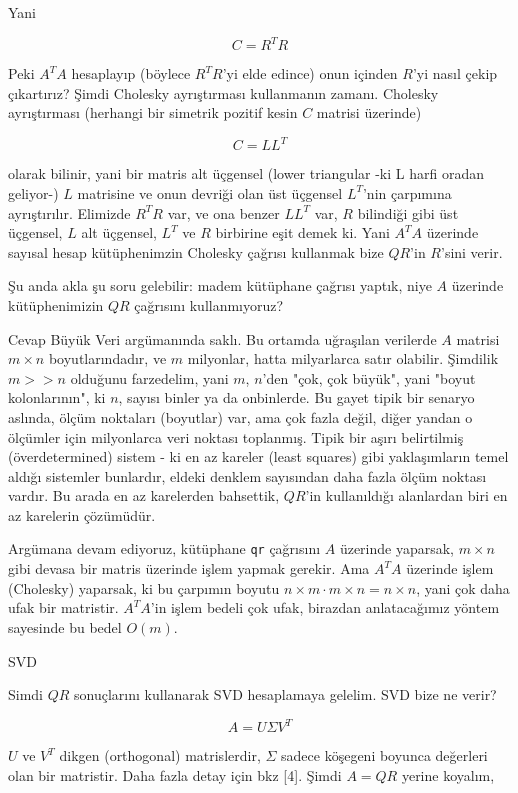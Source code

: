 \documentclass[12pt,fleqn]{article}\usepackage{../../common}
\begin{document}
Yani

$$
C = R^TR
$$

Peki $A^TA$ hesaplayıp (böylece $R^TR$'yi elde edince) onun içinden $R$'yi nasıl
çekip çıkartırız? Şimdi Cholesky ayrıştırması kullanmanın zamanı. Cholesky
ayrıştırması (herhangi bir simetrik pozitif kesin $C$ matrisi üzerinde)

$$C = LL^T$$

olarak bilinir, yani bir matris alt üçgensel (lower triangular -ki L harfi
oradan geliyor-) $L$ matrisine ve onun devriği olan üst üçgensel $L^T$'nin
çarpımına ayrıştırılır. Elimizde $R^TR$ var, ve ona benzer $LL^T$ var, $R$
bilindiği gibi üst üçgensel, $L$ alt üçgensel, $L^T$ ve $R$ birbirine eşit demek
ki. Yani $A^TA$ üzerinde sayısal hesap kütüphenimzin Cholesky çağrısı kullanmak
bize $QR$'in $R$'sini verir.

Şu anda akla şu soru gelebilir: madem kütüphane çağrısı yaptık, niye $A$
üzerinde kütüphenimizin $QR$ çağrısını kullanmıyoruz?

Cevap Büyük Veri argümanında saklı. Bu ortamda uğraşılan verilerde $A$ matrisi
$m \times n$ boyutlarındadır, ve $m$ milyonlar, hatta milyarlarca satır
olabilir. Şimdilik $m >> n$ olduğunu farzedelim, yani $m$, $n$'den "çok, çok
büyük", yani "boyut kolonlarının", ki $n$, sayısı binler ya da onbinlerde. Bu
gayet tipik bir senaryo aslında, ölçüm noktaları (boyutlar) var, ama çok fazla
değil, diğer yandan o ölçümler için milyonlarca veri noktası toplanmış. Tipik
bir aşırı belirtilmiş (överdetermined) sistem - ki en az kareler (least squares)
gibi yaklaşımların temel aldığı sistemler bunlardır, eldeki denklem sayısından
daha fazla ölçüm noktası vardır. Bu arada en az karelerden bahsettik, $QR$'in
kullanıldığı alanlardan biri en az karelerin çözümüdür.

Argümana devam ediyoruz, kütüphane \verb!qr! çağrısını $A$ üzerinde yaparsak, $m
\times n$ gibi devasa bir matris üzerinde işlem yapmak gerekir. Ama $A^TA$
üzerinde işlem (Cholesky) yaparsak, ki bu çarpımın boyutu $n \times m \cdot m
\times n = n \times n$, yani çok daha ufak bir matristir. $A^TA$'in işlem bedeli
çok ufak, birazdan anlatacağımız yöntem sayesinde bu bedel $O(m)$.

SVD

Simdi $QR$ sonuçlarını kullanarak SVD hesaplamaya gelelim. SVD bize ne verir?

$$ A = U \Sigma V^T $$

$U$ ve $V^T$ dikgen (orthogonal) matrislerdir, $\Sigma$ sadece köşegeni
boyunca değerleri olan bir matristir. Daha fazla detay için bkz [4]. Şimdi
$A = QR$ yerine koyalım,
\end{document}
